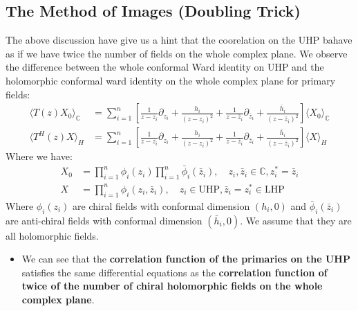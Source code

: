 \subsection{The Method of Images (Doubling Trick)}\label{sec:Method of Images}

The above discussion have give us a hint that the coorelation on the
UHP bahave as if we have twice the number of fields on the whole
complex plane. We observe the difference between the whole conformal
Ward identity on UHP and the holomorphic conformal ward identity on
the whole complex plane for primary fields:
\begin{align}
  \langle T(z) X_0 \rangle_{\mathbb{C}}& = \sum_{i=1}^n \left[
    \frac{1}{z - z_i} \partial_{z_i} + \frac{h_i}{(z - z_i)^2} +
    \frac{1}{z - \bar{z}_i} \partial_{\bar{z}_i} + \frac{\bar{h}_i}{(z
  - \bar{z}_i)^2}\right] \langle X_0 \rangle_{\mathbb{C}}\\
  \langle T^H(z) X \rangle_{H} &= \sum_{i=1}^n \left[ \frac{1}{z -
    z_i} \partial_{z_i} + \frac{h_i}{(z - z_i)^2} + \frac{1}{z -
    \bar{z}_i} \partial_{\bar{z}_i} + \frac{\bar{h}_i}{(z -
  \bar{z}_i)^2}\right] \langle X \rangle_{H}
\end{align}
Where we have:
\begin{align}
  X_0 &= \prod_{i=1}^n \phi_i(z_i) \prod_{i=1}^n
  \bar{\phi}_i(\bar{z}_i), \quad z_i , \bar{z}_i \in \mathbb{C} ,
  z_i^* = \bar{z}_i \\
  X &= \prod_{i=1}^n \phi_i(z_i,\bar{z}_i) , \quad z_i \in \text{UHP}
  , \bar{z}_i = z_i^* \in \text{LHP}
\end{align}
Where $ \phi_i(z_i) $ are chiral fields with conformal dimension $
(h_i,0) $ and $ \bar{\phi}_i(\bar{z}_i) $ are anti-chiral fields with
conformal dimension $ (\bar{h}_i, 0) $. We assume that they are all
holomorphic fields.
\begin{itemize}
  \item We can see that the \textbf{correlation function of the
    primaries on the UHP} satisfies the same differential equations
    as the \textbf{correlation function of twice of the number of
    chiral holomorphic fields on the whole complex plane}.
\end{itemize}


